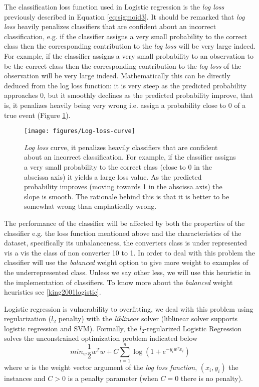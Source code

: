\documentclass[11pt]{article}
\theoremstyle{definition}
\theoremstyle{remark}
\begin{document}
The classification loss function used in Logistic regression is the \emph{log loss} previously described in Equation \ref{eq:sigmoid3}. It should be remarked that \emph{log loss} heavily penalizes classifiers that are confident about an incorrect classification, e.g. if the classifier assigns a very small probability to the correct class then the corresponding contribution to the \emph{log loss} will be very large indeed. 
For example, if the classifier assigns a very small probability to an observation to be the correct class then the corresponding contribution to the \emph{log loss} of the observation will be very large indeed. Mathematically this can be directly deduced from the log loss function: it is very steep as the predicted probability approaches 0, but it smoothly declines as the predicted probability improve, that is, it penalizes heavily being very wrong i.e. assign a probability close to 0 of a true event (Figure \ref{fig:Log-loss-curve}). 
\begin{figure}[H]
        \centering
        \texttt{[image: figures/Log-loss-curve]}
        \caption{\emph{Log loss} curve, it penalizes heavily classifiers that are confident about an incorrect classification. For example, if the classifier assigns a very small probability to the correct class (close to 0 in the abscissa axis) it yields a large loss value. As the predicted probability improves (moving towards 1 in the  abscissa axis) the slope is smooth. The rationale behind this is that it is better to be somewhat wrong than emphatically wrong. 
        }
\label{fig:Log-loss-curve}
\end{figure}

The performance of the classifier will be affected by both the properties of the classifier e.g. the loss function mentioned above and the characteristics of the dataset, specifically its unbalanceness, the converters class is under represented vis a vis the class of non converter 10 to 1. In order to deal with this problem the classifier will use the \emph{balanced} weight option to give more weight to examples of the underrepresented class. Unless we say other less, we will use this heuristic in the implementation of classifiers. To know more about the \emph{balanced} weight heuristics see \ref{king2001logistic}. 

Logistic regression is vulnerability to overfitting, we deal with this problem using regularization ($l_2$ penalty) with the  \emph{liblinear} solver (liblinear solver supports logistic regression and SVM). 
Formally, the $l_2$-regularized Logistic Regression solves the unconstrained optimization problem indicated below \cite{fan2008liblinear}
\begin{equation}
\textit{min}_{w} \frac{1}{2}w^Tw + C \sum_{i=1}^{n}\log(1+ e^{-y_iw^Tx_i})
\end{equation}
where $w$ is the weight vector argument of the \emph{log loss function}, $(x_i,y_i)$ the instances and $C > 0$ is a penalty parameter (when $C=0$ there is no penalty).
\end{document}

